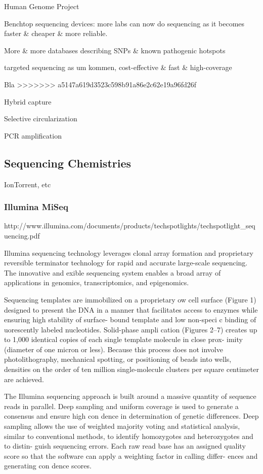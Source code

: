 Human Genome Project

Benchtop sequencing devices: more labs can now do sequencing as it becomes faster
\& cheaper \& more reliable.

More \& more databases describing SNPs \& known pathogenic hotspots

targeted sequencing as um kommen, cost-effective \& fast \& high-coverage

Bla {\cite{enrichment_methods:2011}}
>>>>>>> a5147a619d3523c598b91a86e2c62e19a96fd26f

Hybrid capture

Selective circularization

PCR amplification

\subsection{Sequencing Chemistries}

IonTorrent, etc

\subsubsection{Illumina MiSeq}

http://www.illumina.com/documents/products/techspotlights/techspotlight_sequencing.pdf

Illumina sequencing technology leverages clonal array formation and proprietary reversible terminator technology for rapid and accurate large-scale sequencing. The innovative and  exible sequencing system enables a broad array of applications in genomics, transcriptomics, and epigenomics.

Sequencing templates are immobilized on a proprietary  ow cell surface (Figure 1) designed to present the DNA in a manner that facilitates access to enzymes while ensuring high stability of surface- bound template and low non-speci c binding of  uorescently labeled nucleotides. Solid-phase ampli cation (Figures 2–7) creates up to 1,000 identical copies of each single template molecule in close prox- imity (diameter of one micron or less). Because this process does not involve photolithography, mechanical spotting, or positioning of beads into wells, densities on the order of ten million single-molecule clusters per square centimeter are achieved.

The Illumina sequencing approach is built around a massive quantity of sequence reads in parallel. Deep sampling and uniform coverage is used to generate a consensus and ensure high con dence in determination of genetic differences. Deep sampling allows the use of weighted majority voting and statistical analysis, similar to conventional methods, to identify homozygotes and heterozygotes and to distin- guish sequencing errors. Each raw read base has an assigned quality score so that the software can apply a weighting factor in calling differ- ences and generating con dence scores.

